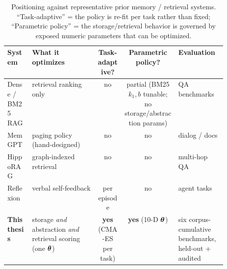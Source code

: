 \begin{table}[t]
\centering
\caption{Positioning against representative prior memory / retrieval systems.
``Task-adaptive'' = the policy is re-fit per task rather than fixed;
``Parametric policy'' = the storage/retrieval behavior is governed by exposed
numeric parameters that can be optimized.}
\label{tab:related}
\small
\begin{tabular}{l p{0.30\linewidth} c c p{0.22\linewidth}}
\toprule
System & What it optimizes & Task-adaptive? & Parametric policy? & Evaluation \\
\midrule
Dense / BM25 RAG & retrieval ranking only & no & partial (BM25 $k_1,b$ tunable; no storage/abstraction params) & QA benchmarks \\
MemGPT \citep{packer2023memgpt} & paging policy (hand-designed) & no & no & dialog / docs \\
HippoRAG \citep{gutierrez2024hipporag} & graph-indexed retrieval & no & no & multi-hop QA \\
Reflexion \citep{shinn2023reflexion} & verbal self-feedback & per episode & no & agent tasks \\
\midrule
\textbf{This thesis} & storage \emph{and} abstraction \emph{and} retrieval scoring (one $\boldsymbol{\theta}$) & \textbf{yes} (CMA-ES per task) & \textbf{yes} (10-D $\boldsymbol{\theta}$) & six corpus-cumulative benchmarks, held-out + audited \\
\bottomrule
\end{tabular}
\end{table}
